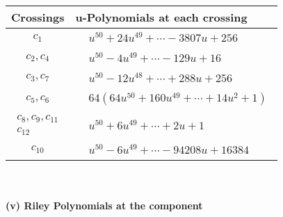 \documentclass[1p]{elsarticle_modified}
\theoremstyle{definition}
\begin{document}
\begin{tabular}{m{50pt}|m{274pt}}
Crossings & \hspace{64pt}u-Polynomials at each crossing \\
\hline $$\begin{aligned}c_{1}\end{aligned}$$&$\begin{aligned}
&u^{50}+24 u^{49}+\cdots-3807 u+256
\end{aligned}$\\
\hline $$\begin{aligned}c_{2},c_{4}\end{aligned}$$&$\begin{aligned}
&u^{50}-4 u^{49}+\cdots-129 u+16
\end{aligned}$\\
\hline $$\begin{aligned}c_{3},c_{7}\end{aligned}$$&$\begin{aligned}
&u^{50}-12 u^{48}+\cdots+288 u+256
\end{aligned}$\\
\hline $$\begin{aligned}c_{5},c_{6}\end{aligned}$$&$\begin{aligned}
&64(64 u^{50}+160 u^{49}+\cdots+14 u^2+1)
\end{aligned}$\\
\hline $$\begin{aligned}c_{8},c_{9},c_{11}\\c_{12}\end{aligned}$$&$\begin{aligned}
&u^{50}+6 u^{49}+\cdots+2 u+1
\end{aligned}$\\
\hline $$\begin{aligned}c_{10}\end{aligned}$$&$\begin{aligned}
&u^{50}-6 u^{49}+\cdots-94208 u+16384
\end{aligned}$\\
\hline
\end{tabular}\\~\\
\newpage\renewcommand{\arraystretch}{1}
\flushleft \textbf{(v) Riley Polynomials at the component}\newline \\
\end{document}
